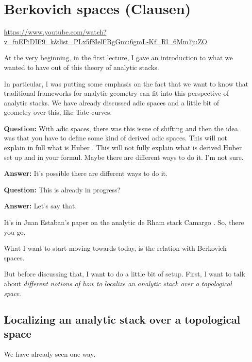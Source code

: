 
\section{\ufs Berkovich spaces (Clausen)}

\url{https://www.youtube.com/watch?v=fnEPiDIF9_k&list=PLx5f8IelFRgGmu6gmL-Kf_Rl_6Mm7juZO}
\renewcommand{\yt}[2]{\href{https://www.youtube.com/watch?v=fnEPiDIF9_k&list=PLx5f8IelFRgGmu6gmL-Kf_Rl_6Mm7juZO&t=#1}{#2}}
\vspace{1em}

At the very beginning, in the first lecture, I gave an introduction to what we wanted to have out of this theory of analytic stacks.

In particular, I was putting some emphasis on the fact that we want to know that traditional frameworks for analytic geometry can fit into this perspective of analytic stacks.
We have already discussed adic spaces and a little bit of geometry over this, like Tate curves. 

\textbf{Question:} With adic spaces, there was this issue of shifting and then the idea was that you have to define some kind of derived adic spaces. This will not explain in full what is Huber . This will not fully explain what is derived Huber  set up and in your formul. 
Maybe there are different ways to do it. I'm not sure.

\textbf{Answer:} It's possible there are different ways to do it. 

\textbf{Question:} This is already in progress?

\textbf{Answer:} Let's say that. 


It's in Juan Estaban's paper on the analytic de Rham stack Camargo \cite{AnalyticRhamStackRigid} . So, there you go. 

What I want to start moving towards today, is the relation with Berkovich spaces.

But before discussing that, I want to do a little bit of setup. First, I want to talk about \emph{different notions of how to localize an analytic stack over a topological space}. 

\subsection{Localizing an analytic stack over a topological space} \label{subsec:localizing_an_analytic_stack}
We have already seen one way. 

